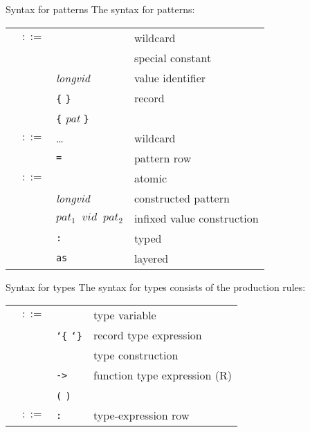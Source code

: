 \begin{grammar}{Syntax for patterns}
The syntax for patterns:
\begin{longtable}{rcll}
\label{grammar:atpat}\nonterminal{atpat} & $::=$ & \wildcard & wildcard\\
& \alt & \nonterminal{scon} & special constant\\
& \alt & \optional{\texttt{op}} \textit{longvid} & value identifier\\
& \alt & \verb+{+ \optional{\textit{patrow}} \verb+}+ & record\\
& \alt & \verb+{+ \textit{pat} \verb+}+ &\\
\label{grammar:patrow}\nonterminal{patrow} & $::=$ & \dots & wildcard\\
& \alt & \nonterminal{lab} \verb+=+ \nonterminal{pat} \optional{\texttt{\char`,} \nonterminal{patrow}} & pattern row\\
\label{grammar:pat}\nonterminal{pat} & $::=$ & \nonterminal{atpat} & atomic\\
& \alt & \optional{\texttt{op}} \textit{longvid} \nonterminal{atpat} & constructed pattern\\
& \alt & $pat_{1}\;\;vid\;\;pat_{2}$ & infixed value construction\\
& \alt & \nonterminal{pat} \texttt{:} \nonterminal{ty} & typed \\
& \alt & \optional{\texttt{op}}\nonterminal{\vid}\optional{\texttt{:} \nonterminal{ty}} \texttt{as} \nonterminal{pat} & layered
\end{longtable}
\end{grammar}

\begin{grammar}{Syntax for types}
The syntax for types consists of the production rules:
\begin{longtable}{rcll}
\label{grammar:ty}\nonterminal{ty} & $::=$ & \nonterminal{tyvar} & type variable\\
& \alt & \texttt{\char`\{} \optional{\textit{tyrow}} \texttt{\char`\}} & record type expression\\
& \alt & \nonterminal{tyseq} \nonterminal{longtycon} & type construction\\
& \alt & \nonterminal{ty} \texttt{->} \nonterminal{ty\/$'$} & function type expression (R)\\
& \alt & \texttt{(} \nonterminal{ty} \texttt{)} & \\
\label{grammar:tyrow}\nonterminal{tyrow} & $::=$ & \nonterminal{lab} \texttt{:} \nonterminal{ty} \optional{\texttt{\char`,} \nonterminal{tyrow}} & type-expression row\\
\end{longtable}
\end{grammar}

